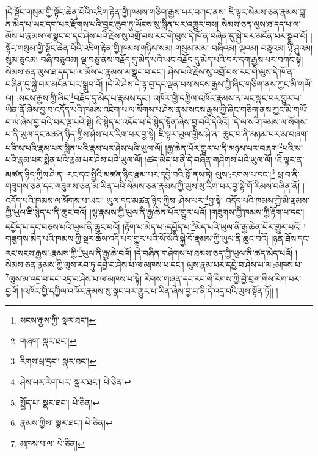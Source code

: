 །དེ་སྟོང་གསུམ་གྱི་སྟོང་ཆེན་པོའི་འཇིག་རྟེན་གྱི་ཁམས་གཅིག་རྒྱས་པར་བཀང་ནས། ཇི་ལྟར་སེམས་ཅན་རྣམས་བླ་ན་མེད་པ་ཡང་དག་པར་རྫོགས་པའི་བྱང་ཆུབ་ཏུ་ཡོངས་སུ་སྨིན་པར་འགྱུར་བས། སེམས་ཅན་ལུས་ཐ་དད་པ་ལ་མོས་པ་རྣམས་ལ་སྣང་བ་དང་ཤེས་པའི་རྗེས་སུ་འགྲོ་བས་རང་གི་ལུས་དེ་ཁོ་ན་བཞིན་དུ་སྐྱེ་བར་མངོན་པར་སྒྲུབ་བོ། །སྟོང་གསུམ་གྱི་སྟོང་ཆེན་པོའི་འཇིག་རྟེན་གྱི་ཁམས་གཉིས་སམ། གསུམ་མམ། བཞིའམ། ལྔའམ། བཅུའམ། ཉི་ཤུའམ། སུམ་ཅུའམ། བཞི་བཅུའམ། ལྔ་བཅུ་ནས་བརྗོད་དུ་མེད་པའི་ཡང་བརྗོད་དུ་མེད་པའི་བར་དག་རྒྱས་པར་བཀང་སྟེ། སེམས་ཅན་ལུས་ཐ་དད་པ་ལ་མོས་པ་རྣམས་ལ་སྣང་བ་དང་། ཤེས་པའི་རྗེས་སུ་འགྲོ་བས་རང་གི་ལུས་དེ་ཁོ་ན་བཞིན་དུ་སྐྱེ་བར་མངོན་པར་སྒྲུབ་བོ། །དེ་ཡེ་ཤེས་དེ་ལྟ་བུ་དང་ལྡན་པས་སངས་རྒྱས་ཀྱི་ཞིང་གཅིག་ནས་ཀྱང་མི་གཡོ་ལ། :སངས་རྒྱས་ཀྱི་ཞིང་\footnote{སངས་རྒྱས་ཀྱི་  སྣར་ཐང་། }བརྗོད་དུ་མེད་པ་རྣམས་དང་། འཁོར་གྱི་དཀྱིལ་འཁོར་རྣམས་ན་ཡང་སྣང་བར་གྱུར་པ་ཡིན་ནོ་ཞེས་བྱ་བ་འདོད་པའི་ཁམས་འཇིག་པ་ལ་སོགས་པ་ཤེས་ནས་སངས་རྒྱས་ཀྱི་ཞིང་གཅིག་ནས་ཀྱང་མི་གཡོ་བ་ལ་ཞེས་བྱ་བའི་བར་ལྔ་པའི་སྟེ། ཇི་སྙེད་པ་འདོད་པ་དེ་སྙེད་སྟོན་ཞེས་བྱ་བའི་དེའིའོ། །དེ་ལ་སའི་ཁམས་ལ་སོགས་པ་ནི་ཡུལ་དང་མཚན་ཉིད་ཀྱིས་ཤེས་པར་རིག་པར་བྱ་སྟེ། ཇི་ལྟར་ཡུལ་གྱིས་ཤེ་ན། ཆུང་བ་ནི་མཉམ་པར་མ་བཞག་པའི་ས་པའི་རྣམ་པར་སྨིན་པའི་རྣམ་པར་ཤེས་པའི་ཡུལ་ལོ། །རྒྱ་ཆེན་པོར་གྱུར་པ་ནི་མཉམ་པར་བཞག་\footnote{གཞག་  སྣར་ཐང་། }པའི་ས་པའི་རྣམ་པར་སྨིན་པའི་རྣམ་པར་ཤེས་པའི་ཡུལ་ལོ། །ཚད་མེད་པ་ནི་དེ་བཞིན་གཤེགས་པའི་ཡུལ་ལོ། །ཇི་ལྟར་ན་མཚན་ཉིད་ཀྱིས་ཤེ་ན། རང་དང་སྤྱིའི་མཚན་ཉིད་རྣམ་པར་དབྱེ་བའི་སྒོ་ནས་ཏེ། ལུས་:རགས་པ་དང་།\footnote{རིགས་པྲ་དྲང་།  སྣར་ཐང་། } ཕྲ་བ་ནི་གཟུགས་ཅན་དང་གཟུགས་ཅན་མ་ཡིན་པའི་སེམས་ཅན་རྣམས་ཀྱི་ལུས་སུ་རིག་པར་བྱ་སྟེ་གོ་རིམས་བཞིན་ནོ། །འདོད་པའི་ཁམས་ལ་སོགས་པ་ཡང་། ཡུལ་དང་མཚན་ཉིད་ཀྱིས་:ཤེས་པར་\footnote{ཤེས་པར་རིག་པར་  སྣར་ཐང་།  པེ་ཅིན། }བྱ་སྟེ། འདོད་པའི་ཁམས་ཀྱི་མི་རྣམས་ཀྱི་ཡུལ་ཇི་སྙེད་པ་ནི་ཆུང་བའོ། །ལྷ་རྣམས་ཀྱི་ཡུལ་ནི་རྒྱ་ཆེན་པོར་གྱུར་པའོ། །གཟུགས་ཀྱི་ཁམས་ཀྱི་རྟོག་པ་དང་། དཔྱོད་པ་དང་བཅས་པའི་ཡུལ་ནི་ཆུང་བའོ། །རྟོག་པ་མེད་པ་:དཔྱོད་པ་\footnote{སྤྱོད་པ་  སྣར་ཐང་།  པེ་ཅིན། }མེད་པའི་ཡུལ་ནི་རྒྱ་ཆེན་པོར་གྱུར་པའོ། །གཟུགས་མེད་པའི་ཁམས་ཀྱི་སྔར་ཆོས་འདི་པར་གྱུར་པའི་སོ་སོའི་སྐྱེ་བོ་རྣམས་ཀྱི་ཡུལ་ནི་ཆུང་བའོ། །ཉན་ཐོས་དང་རང་སངས་རྒྱས་:རྣམས་ཀྱི་\footnote{རྣམས་ཀྱིས་  སྣར་ཐང་།  པེ་ཅིན། }ཡུལ་ནི་རྒྱ་ཆེ་བའོ། །དེ་བཞིན་གཤེགས་པ་ཐམས་ཅད་ཀྱི་ཡུལ་ནི་ཚད་མེད་པའོ། །སེམས་ཅན་རྣམས་ཀྱི་ལུས་རབ་ཏུ་དབྱེ་བ་ཤེས་པ་ལ་མཁས་པ་དང་། ལུས་རྣམ་པར་དབྱེ་བ་ཤེས་པ་ལ་:མཁས་པ་\footnote{མཁས་པ་ལ་  པེ་ཅིན། }ལུས་མ་འདྲ་བ་དང་འདྲ་བ་ཤེས་པ་ལ་མཁས་པ་སྟེ། རིགས་གཞན་དང་རང་གི་རིགས་ཀྱི་བྱེ་བྲག་གིས་རིག་པར་བྱའོ། །འཁོར་གྱི་དཀྱིལ་འཁོར་རྣམས་སུ་སྣང་བར་གྱུར་པ་ཡིན་ཞེས་བྱ་བ་ནི་དེ་འདྲ་བའི་ལུས་སྟོན་ཏོ།། །
